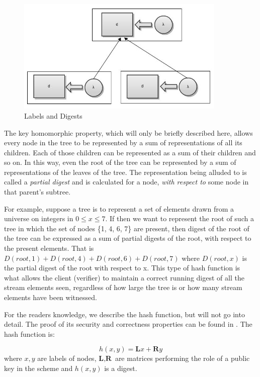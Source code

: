 \documentclass[11pt, letterpaper, oneside]{article}
\begin{document}
        \begin{figure}[h]
        \centering
        \includegraphics[width=100mm]{./images/label_digest.jpg}
        \caption[]{Labels and Digests}
        \label{fig:labels-and-digests}
        \end{figure}

	The key homomorphic property, which will only be briefly described here, allows every node in the tree to be represented by a sum of representations of all its children.
	Each of those children can be represented as a sum of their children and so on.
	In this way, even the root of the tree can be represented by a sum of representations of the leaves of the tree.
	The representation being alluded to is called a \textit{partial digest} and is calculated for a node, \textit{with respect to} some node in that parent's subtree.

	For example, suppose a tree is to represent a set of elements drawn from a universe on integers in $0 \leq x \leq 7$.
	If then we want to represent the root of such a tree in which the set of nodes \{1, 4, 6, 7\} are present, then digest of the root of the tree can be expressed as a sum of partial digests of the root, with respect to the present elements.
	That is $\textit{D}(root, 1)+\textit{D}(root, 4)+\textit{D}(root, 6)+\textit{D}(root, 7)$ where $\textit{D}(root, x)$ is the partial digest of the root with respect to x.
	This type of hash function is what allows the client (verifier) to maintain a correct running digest of all the stream elements seen, regardless of how large the tree is or how many stream elements have been witnessed.

	For the readers knowledge, we describe the hash function, but will not go into detail.  The proof of its security and correctness properties can be found in \cite{sads}.
	The hash function is:

	\begin{equation}
		h(x,y)= \textbf{L} x + \textbf{R}y
	\end{equation}
	where $x, y$ are labels of nodes, $\textbf{L}, \textbf{R}$ are matrices performing the role of a public key in the scheme and $h(x,y)$ is a digest.
\end{document}
